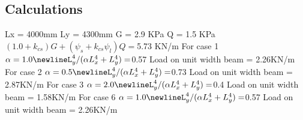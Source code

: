 \documentclass{article}%
\begin{document}
%
\subsection*{Calculations}%
\label{subsec:Calculations}%

%
Lx = 4000mm\newline%
\newline%
Ly = 4300mm%
\newline%
\newline%
G = 2.9 KPa\newline%
Q = 1.5 KPa\newline%
\newline%
%
$(1.0 + k_{cs})G + (\psi_{s} + k_{cs}\psi_{l})Q = $5.73 KN/m%
\newline%
\newline%
%
For case 1%
\newline%
\newline%
%
$\alpha = 1.0%
\newline%
\newline%
%
L_{y}^{4} / (\alpha L_{x}^{4} + L_{y}^{4}) = $0.57%
\newline%
\newline%
 Load on unit width beam = 2.26KN/m%
\newline%
\newline%
%
For case 2%
\newline%
\newline%
%
$\alpha = 0.5%
\newline%
\newline%
%
L_{y}^{4} / (\alpha L_{x}^{4} + L_{y}^{4}) = $0.73%
\newline%
\newline%
 Load on unit width beam = 2.87KN/m%
\newline%
\newline%
%
For case 3%
\newline%
\newline%
%
$\alpha = 2.0%
\newline%
\newline%
%
L_{y}^{4} / (\alpha L_{x}^{4} + L_{y}^{4}) = $0.4%
\newline%
\newline%
 Load on unit width beam = 1.58KN/m%
\newline%
\newline%
%
For case 6%
\newline%
\newline%
%
$\alpha = 1.0%
\newline%
\newline%
%
L_{y}^{4} / (\alpha L_{x}^{4} + L_{y}^{4}) = $0.57%
\newline%
\newline%
 Load on unit width beam = 2.26KN/m%
\end{document}
